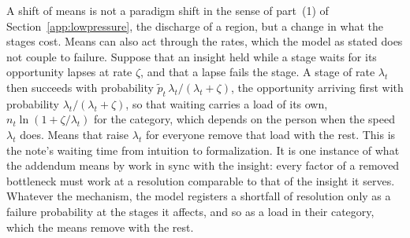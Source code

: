 \documentclass{article}
\begin{document}
\noindent A shift of means is not a paradigm shift in the sense of part~(1) of Section~\ref{app:lowpressure}, the discharge of a region, but a change in what the stages cost. Means can also act through the rates, which the model as stated does not couple to failure. Suppose that an insight held while a stage waits for its opportunity lapses at rate $\zeta$, and that a lapse fails the stage. A stage of rate $\lambda_t$ then succeeds with probability $\widetilde{p}_t\,\lambda_t/(\lambda_t + \zeta)$, the opportunity arriving first with probability $\lambda_t/(\lambda_t + \zeta)$, so that waiting carries a load of its own, $n_t\ln(1 + \zeta/\lambda_t)$ for the category, which depends on the person when the speed $\lambda_t$ does. Means that raise $\lambda_t$ for everyone remove that load with the rest. This is the note's waiting time from intuition to formalization. It is one instance of what the addendum means by work in sync with the insight: every factor of a removed bottleneck must work at a resolution comparable to that of the insight it serves. Whatever the mechanism, the model registers a shortfall of resolution only as a failure probability at the stages it affects, and so as a load in their category, which the means remove with the rest.
\end{document}
